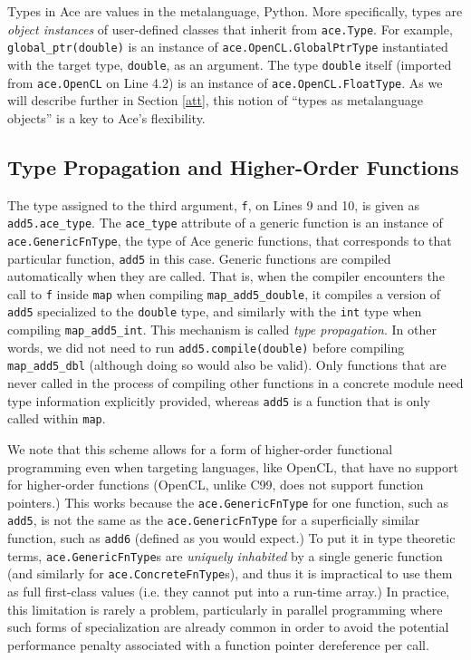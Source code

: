 \documentclass[10pt, conference, compsocconf]{IEEEtran}
\begin{document}
Types in Ace are values in the metalanguage, Python. More specifically, types are {\em object instances} of user-defined classes that inherit from \verb|ace.Type|. For example, \verb|global_ptr(double)| is an instance of \verb|ace.OpenCL.GlobalPtrType| instantiated with the target type, \verb|double|, as an argument. The type \verb|double| itself (imported from \verb|ace.OpenCL| on Line 4.2) is an instance of \verb|ace.OpenCL.FloatType|. As we will describe further in Section \ref{att}, this notion of ``types as metalanguage objects'' is a key to Ace's flexibility.

\subsection{Type Propagation and Higher-Order Functions}
The type assigned to the third argument, \verb|f|, on Lines 9 and 10, is given as \verb|add5.ace_type|. The \verb|ace_type| attribute of a generic function is an instance of \verb|ace.GenericFnType|, the type of Ace generic functions, that corresponds to that particular function, \verb|add5| in this case. Generic functions are compiled automatically when they are called. That is, when the compiler encounters the call to \verb|f| inside \verb|map| when compiling \verb|map_add5_double|, it compiles a version of \verb|add5| specialized to the \verb|double| type, and similarly with the \verb|int| type when compiling \verb|map_add5_int|. This mechanism is called {\em type propagation}. In other words, we did not need to run \verb|add5.compile(double)| before compiling \verb|map_add5_dbl| (although doing so would also be valid). Only functions that are never called in the process of compiling other functions in a concrete module need type information explicitly provided, whereas \verb|add5| is a function that is only called within \verb|map|. 

We note that this scheme allows for a form of higher-order functional programming even when targeting languages, like OpenCL, that have no support for higher-order functions (OpenCL, unlike C99, does not support function pointers.) This works because the \verb|ace.GenericFnType| for one function, such as \verb|add5|, is not the same as the \verb|ace.GenericFnType| for a superficially similar function, such as \verb|add6| (defined as you would expect.) To put it in type theoretic terms, \verb|ace.GenericFnType|s are {\em uniquely inhabited} by a single generic function (and similarly for \verb|ace.ConcreteFnType|s), and thus it is impractical to use them as full first-class values (i.e. they cannot put into a run-time array.) In practice, this limitation is rarely a problem, particularly in parallel programming where such forms of specialization are already common in order to avoid the potential performance penalty associated with a function pointer dereference per call.
\end{document}
